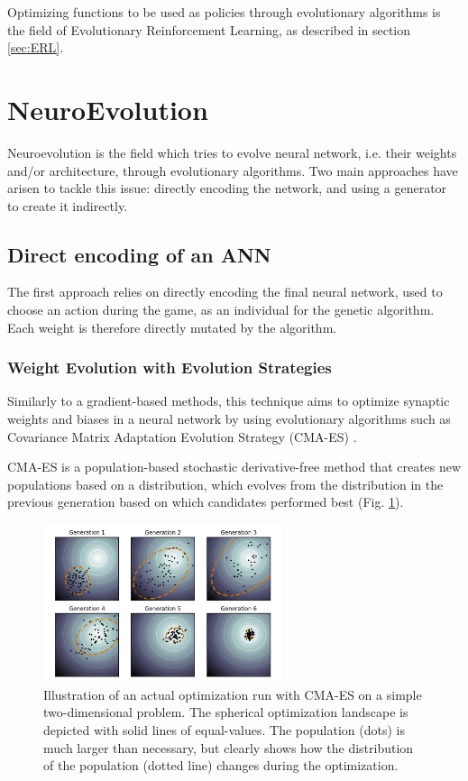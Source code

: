 Optimizing functions to be used as policies through evolutionary algorithms is the field of Evolutionary Reinforcement Learning, as described in section \ref{sec:ERL}.

\section{NeuroEvolution}

Neuroevolution is the field which tries to evolve neural network, i.e. their weights and/or architecture, through evolutionary algorithms. Two main approaches have arisen to tackle this issue: directly encoding the network, and using a generator to create it indirectly.

\subsection{Direct encoding of an ANN}
The first approach relies on directly encoding the final neural network, used to choose an action during the game, as an individual for the genetic algorithm. Each weight is therefore directly mutated by the algorithm.

\subsubsection{Weight Evolution with Evolution Strategies}
Similarly to a gradient-based methods, this technique aims to optimize synaptic weights and biases in a neural network by using evolutionary algorithms such as Covariance Matrix Adaptation Evolution Strategy (CMA-ES) \cite{CMA-ES} \cite{CMAES-Atari}.

CMA-ES is a population-based stochastic derivative-free method that creates new populations based on a distribution, which evolves from the distribution in the previous generation based on which candidates performed best (Fig. \ref{CMA-ES}).

\begin{figure}[H]
 \centering
 \captionsetup{justification=centering, margin=0.5cm}
 \includegraphics[width=7cm]{images/CMA_ES.png}
 \caption{\label{CMA-ES}Illustration of an actual optimization run with CMA-ES on a simple two-dimensional problem. The spherical optimization landscape is depicted with solid lines of equal-values. The population (dots) is much larger than necessary, but clearly shows how the distribution of the population (dotted line) changes during the optimization. \cite{wiki:cmaes}}
 \label{CMA-ES}
\end{figure}

